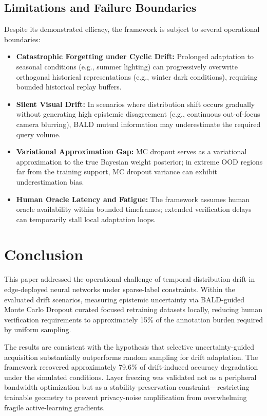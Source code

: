 \documentclass[conference]{IEEEtran}
\begin{document}
\subsection{Limitations and Failure Boundaries}
Despite its demonstrated efficacy, the framework is subject to several operational boundaries:
\begin{itemize}
    \item \textbf{Catastrophic Forgetting under Cyclic Drift:} Prolonged adaptation to seasonal conditions (e.g., summer lighting) can progressively overwrite orthogonal historical representations (e.g., winter dark conditions), requiring bounded historical replay buffers.
    \item \textbf{Silent Visual Drift:} In scenarios where distribution shift occurs gradually without generating high epistemic disagreement (e.g., continuous out-of-focus camera blurring), BALD mutual information may underestimate the required query volume.
    \item \textbf{Variational Approximation Gap:} MC dropout serves as a variational approximation to the true Bayesian weight posterior; in extreme OOD regions far from the training support, MC dropout variance can exhibit underestimation bias.
    \item \textbf{Human Oracle Latency and Fatigue:} The framework assumes human oracle availability within bounded timeframes; extended verification delays can temporarily stall local adaptation loops.
\end{itemize}

\section{Conclusion}

This paper addressed the operational challenge of temporal distribution drift in edge-deployed neural networks under sparse-label constraints. Within the evaluated drift scenarios, measuring epistemic uncertainty via BALD-guided Monte Carlo Dropout curated focused retraining datasets locally, reducing human verification requirements to approximately 15\% of the annotation burden required by uniform sampling.

The results are consistent with the hypothesis that selective uncertainty-guided acquisition substantially outperforms random sampling for drift adaptation. The framework recovered approximately 79.6\% of drift-induced accuracy degradation under the simulated conditions. Layer freezing was validated not as a peripheral bandwidth optimization but as a stability-preservation constraint---restricting trainable geometry to prevent privacy-noise amplification from overwhelming fragile active-learning gradients.
\end{document}
